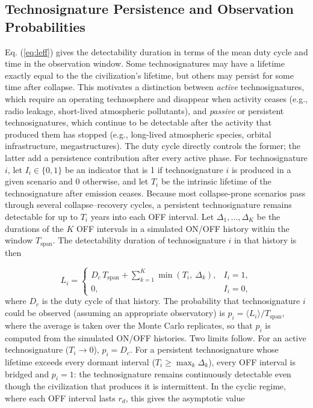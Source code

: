 \subsection{Technosignature Persistence and Observation Probabilities}\label{technosignature-persistence}

Eq. (\ref{eq:leff}) gives the detectability duration in terms of the mean duty cycle and time in the observation window. Some technosignatures may have a lifetime exactly equal to the the civilization's lifetime, but others may persist for some time after collapse. This motivates a distinction between \emph{active} technosignatures, which require an operating technosphere and disappear when activity ceases (e.g., radio leakage, short-lived atmospheric pollutants), and \emph{passive} or persistent technosignatures, which continue to be detectable after the activity that produced them has stopped (e.g., long-lived atmospheric species, orbital infrastructure, megastructures). The duty cycle directly controls the former; the latter add a persistence contribution after every active phase. For technosignature $i$, let $I_{i} \in \{0, 1\}$ be an indicator that is 1 if technosignature $i$ is produced in a given scenario and 0 otherwise, and let $T_i$ be the intrinsic lifetime of the technosignature after emission ceases. Because most collapse-prone scenarios pass through several collapse--recovery cycles, a persistent technosignature remains detectable for up to $T_i$ years into each OFF interval. Let $\Delta_1, \ldots, \Delta_K$ be the durations of the $K$ OFF intervals in a simulated ON/OFF history within the window $T_{\text{span}}$. The detectability duration of technosignature $i$ in that history is then

\begin{equation}
L_{i}=
\begin{cases}
D_c\,T_{\text{span}} + \displaystyle\sum_{k=1}^{K} \min\!\left(T_i,\ \Delta_k\right), & I_{i} = 1,\\[4pt]
0, & I_{i} = 0,
\end{cases}
\label{eq:li}
\end{equation}
%
where $D_c$ is the duty cycle of that history. The probability that technosignature $i$ could be observed (assuming an appropriate observatory) is $p_i = \langle L_i \rangle / T_{\text{span}}$, where the average is taken over the Monte Carlo replicates, so that $p_i$ is computed from the simulated ON/OFF histories. Two limits follow. For an active technosignature ($T_i \to 0$), $p_i = D_c$. For a persistent technosignature whose lifetime exceeds every dormant interval ($T_i \geq \max_k \Delta_k$), every OFF interval is bridged and $p_i = 1$: the technosignature remains continuously detectable even though the civilization that produces it is intermittent. In the cyclic regime, where each OFF interval lasts $r_d$, this gives the asymptotic value

